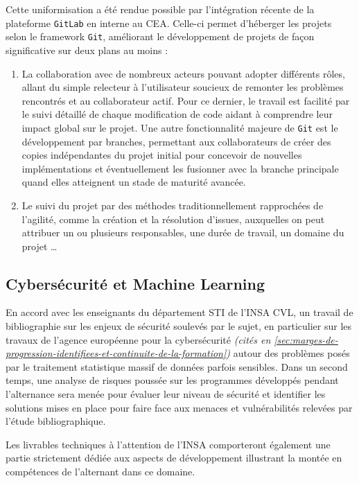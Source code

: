         Cette uniformisation a été rendue possible par l'intégration récente de la plateforme \texttt{GitLab} en interne au \gls{CEA}.
        Celle-ci permet d'héberger les projets selon le framework \texttt{Git}, améliorant le développement de projets de façon significative sur deux plans au moins :
        \begin{enumerate}
            \item La collaboration avec de nombreux acteurs pouvant adopter différents rôles, allant du simple relecteur à l'utilisateur soucieux de remonter les problèmes rencontrés et au collaborateur actif.
            Pour ce dernier, le travail est facilité par le suivi détaillé de chaque modification de code aidant à comprendre leur impact global sur le projet.
            Une autre fonctionnalité majeure de \texttt{Git} est le développement par branches, permettant aux collaborateurs de créer des copies indépendantes du projet initial pour concevoir de nouvelles implémentations et éventuellement les fusionner avec la branche principale quand elles atteignent un stade de maturité avancée.
            \item Le suivi du projet par des méthodes traditionnellement rapprochées de l'agilité, comme la création et la résolution d'issues, auxquelles on peut attribuer un ou plusieurs responsables, une durée de travail, un domaine du projet \ldots
        \end{enumerate}

    \subsection{Cybersécurité et Machine Learning}\label{subsec:cybersecurite-et-machine-learning}

    En accord avec les enseignants du département \gls{STI} de l'INSA CVL, un travail de bibliographie sur les enjeux de sécurité soulevés par le sujet, en particulier sur les travaux de l'agence européenne pour la cybersécurité \textit{(cités en \ref{sec:marges-de-progression-identifiees-et-continuite-de-la-formation})} autour des problèmes posés par le traitement statistique massif de données parfois sensibles.
    Dans un second temps, une analyse de risques poussée sur les programmes développés pendant l'alternance sera menée pour évaluer leur niveau de sécurité et identifier les solutions mises en place pour faire face aux menaces et vulnérabilités relevées par l'étude bibliographique.

    Les livrables techniques à l'attention de l'INSA comporteront également une partie strictement dédiée aux aspects de développement illustrant la montée en compétences de l'alternant dans ce domaine.